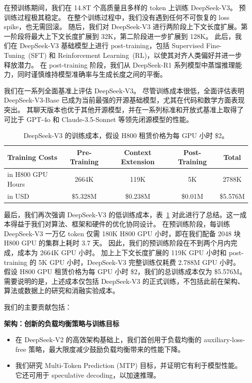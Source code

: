 \documentclass[11pt, a4paper, logo, copyright, nonumbering]{deepseek}
\newcommand{\dsvii}{DeepSeek-V2}
\newcommand{\dsviii}{DeepSeek-V3}
\begin{document}
在预训练期间，我们在 14.8T 个高质量且多样的 token 上训练 \dsviii{}。
预训练过程极其稳定。
在整个训练过程中，我们没有遇到任何不可恢复的 loss spike，也无需回滚。
随后，我们对 \dsviii{} 进行两阶段上下文长度扩展。第一阶段将最大上下文长度扩展到 32K，第二阶段进一步扩展到 128K。
此后，我们在 \dsviii{} 基础模型上进行 post-training，包括 Supervised Fine-Tuning~(SFT) 和 Reinforcement Learning~(RL)，以使其对齐人类偏好并进一步释放潜力。
在 post-training 阶段，我们从 DeepSeek-R1 系列模型中蒸馏推理能力，同时谨慎维持模型准确率与生成长度之间的平衡。

我们在一系列全面基准上评估 \dsviii{}。
尽管训练成本很低，全面评估表明 \dsviii{}-Base 已成为当前最强的开源基础模型，尤其在代码和数学方面表现突出。
其聊天版本也优于其他开源模型，并在一系列标准和开放式基准上取得了可比于 GPT-4o 和 Claude-3.5-Sonnet 等领先闭源模型的性能。

\begin{table}[t]
    \centering
    \setlength{\tabcolsep}{6pt}
    \begin{tabular}{l | c c c | c}
        \toprule
        \textbf{Training Costs} & \textbf{Pre-Training} & \textbf{Context Extension} & \textbf{Post-Training} & \textbf{Total} \\
        \midrule
        in H800 GPU Hours & 2664K & 119K & 5K & 2788K \\
        in USD & \$5.328M & \$0.238M & \$0.01M & \$5.576M \\
        \bottomrule
    \end{tabular}
    \caption{
    \dsviii{} 的训练成本，假设 H800 租赁价格为每 GPU 小时 \$2。
    }
    \label{tab:cost}
\end{table}

最后，我们再次强调 \dsviii{} 的低训练成本，表~\ref{tab:cost} 对此进行了总结。这一成本得益于我们对算法、框架和硬件的优化协同设计。
在预训练阶段，每训练 \dsviii{} 一万亿 token 仅需 180K H800 GPU 小时，即在我们配备 2048 块 H800 GPU 的集群上耗时 3.7 天。
因此，我们的预训练阶段在不到两个月内完成，成本为 2664K GPU 小时。
加上上下文长度扩展的 119K GPU 小时和 post-training 的 5K GPU 小时，\dsviii{} 完整训练仅耗费 2.788M GPU 小时。
假设 H800 GPU 租赁价格为每 GPU 小时 \$2，我们的总训练成本仅为 \$5.576M。
需要说明的是，上述成本仅包括 \dsviii{} 的正式训练，不包括此前在架构、算法或数据上的研究和消融实验成本。

我们的主要贡献包括：

\noindent
\textbf{架构：创新的负载均衡策略与训练目标}
\begin{itemize}[topsep=0pt]
    \item 
    在 \dsvii{} 的高效架构基础上，我们首创用于负载均衡的 auxiliary-loss-free 策略，最大限度减少鼓励负载均衡带来的性能下降。
    \item 
    我们研究 Multi-Token Prediction (MTP) 目标，并证明它有利于模型性能。
    它还可用于 speculative decoding，以加速推理。
\end{itemize}
\end{document}
